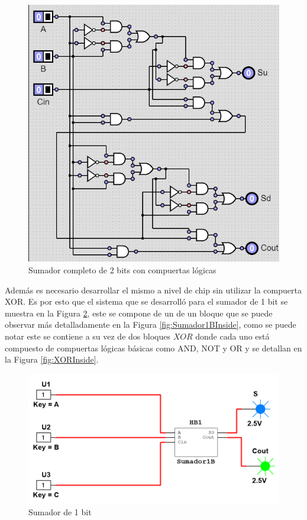 \documentclass[journal]{IEEEtran}
\begin{document}
	\begin{figure}[!htb]
		\centering
		\includegraphics[scale = 0.5]{img/SC2B.png}
		\caption{Sumador completo de 2 bits con compuertas lógicas}
		\label{fig:SC2B}
	\end{figure}
	
	Además es necesario desarrollar el mismo a nivel de chip sin utilizar la compuerta XOR. Es por esto que el sistema que se desarrolló para el sumador de 1 bit se muestra en la Figura \ref{fig:Sumador1B}, este se compone de un de un bloque que se puede observar más detalladamente en la Figura \ref{fig:Sumador1BInside}, como se puede notar este se contiene a su vez de dos bloques $XOR$ donde cada uno está compuesto de compuertas lógicas básicas como AND, NOT y OR y se detallan en la Figura \ref{fig:XORInside}.
	
	\begin{figure}[!htb]
		\centering
		\includegraphics[scale = 0.35]{img/Sumador1B.png}
		\caption{Sumador de 1 bit}
		\label{fig:Sumador1B}
	\end{figure}
	
\end{document}
